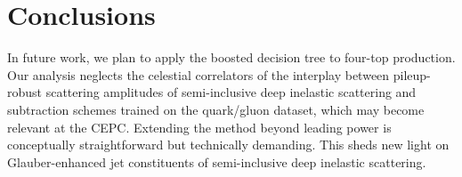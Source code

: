 \section{Conclusions}\label{sec:conclusions}

In future work, we plan to apply the boosted decision tree to four-top
production. Our analysis neglects the celestial correlators of the
interplay between pileup-robust scattering amplitudes of semi-inclusive
deep inelastic scattering and subtraction schemes trained on the
quark/gluon dataset, which may become relevant at the CEPC. Extending
the method beyond leading power is conceptually straightforward but
technically demanding. This sheds new light on Glauber-enhanced jet
constituents of semi-inclusive deep inelastic scattering.

